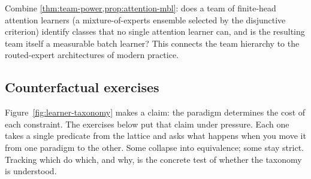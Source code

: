 \begin{openprob}
\label{op:team-attention}
Combine \cref{thm:team-power,prop:attention-mbl}: does a team of finite-head attention learners (a mixture-of-experts ensemble selected by the disjunctive criterion) identify classes that no single attention learner can, and is the resulting team itself a measurable batch learner? This connects the team hierarchy to the routed-expert architectures of modern practice.
\end{openprob}

\subsection*{Counterfactual exercises}

Figure~\ref{fig:learner-taxonomy} makes a claim: the paradigm determines the cost of each constraint. The exercises below put that claim under pressure. Each one takes a single predicate from the lattice and asks what happens when you move it from one paradigm to the other. Some collapse into equivalence; some stay strict. Tracking which do which, and why, is the concrete test of whether the taxonomy is understood.

